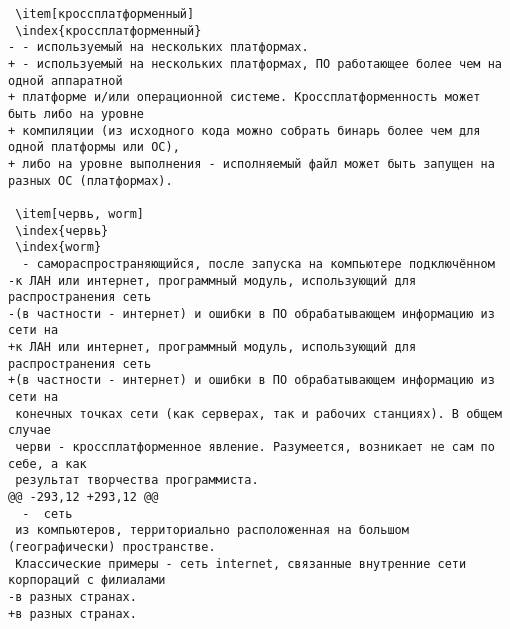 \begin{verbatim}
 \item[кроссплатформенный]
 \index{кроссплатформенный}
- - используемый на нескольких платформах.
+ - используемый на нескольких платформах, ПО работающее более чем на одной аппаратной
+ платформе и/или операционной системе. Кроссплатформенность может быть либо на уровне
+ компиляции (из исходного кода можно собрать бинарь более чем для одной платформы или ОС),
+ либо на уровне выполнения - исполняемый файл может быть запущен на разных ОС (платформах).

 \item[червь, worm]
 \index{червь}
 \index{worm}
  - самораспространяющийся, после запуска на компьютере подключённом
-к ЛАН или интернет, программный модуль, использующий для распространения сеть
-(в частности - интернет) и ошибки в ПО обрабатывающем информацию из сети на
+к ЛАН или интернет, программный модуль, использующий для распространения сеть
+(в частности - интернет) и ошибки в ПО обрабатывающем информацию из сети на
 конечных точках сети (как серверах, так и рабочих станциях). В общем случае
 черви - кроссплатформенное явление. Разумеется, возникает не сам по себе, а как
 результат творчества программиста.
@@ -293,12 +293,12 @@
  -  сеть
 из компьютеров, территориально расположенная на большом (географически) пространстве.
 Классические примеры - сеть internet, связанные внутренние сети корпораций с филиалами
-в разных странах.
+в разных странах.


\end{verbatim}
